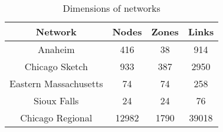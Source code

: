\begin{table}[h!]
\caption{Dimensions of networks}
\label{table:networksdim}
\center
\begin{tabular}{|c|c|c|c|}
\hline
Network	&	Nodes	&	Zones	&	Links\\
\hline
Anaheim		&	416	&	38	&	914\\	
Chicago Sketch	&	933	&	387	&	2950\\
Eastern Massachusetts	&	74	&	74	&	258\\	
Sioux Falls	&	24	&	24	&	76\\
Chicago Regional	&	12982	&	1790	&	39018\\
\hline
\end{tabular}
\end{table}
